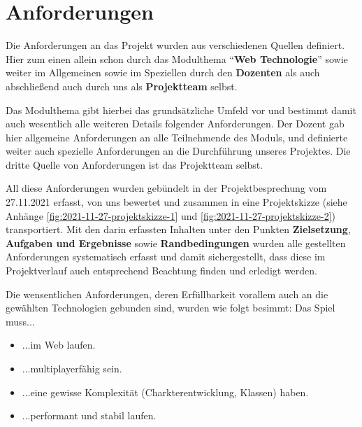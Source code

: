 
\section{Anforderungen} %



Die Anforderungen an das Projekt wurden aus verschiedenen Quellen definiert. Hier zum einen allein schon durch das Modulthema \enquote{\textbf{Web Technologie}} sowie weiter im Allgemeinen sowie im Speziellen durch den \textbf{Dozenten} als auch abschließend auch durch uns als \textbf{Projektteam} selbst. 

Das Modulthema gibt hierbei das grundsätzliche Umfeld vor und bestimmt damit auch wesentlich alle weiteren Details folgender Anforderungen. Der Dozent gab hier allgemeine Anforderungen an alle Teilnehmende des Moduls, und definierte weiter auch spezielle Anforderungen an die Durchführung unseres Projektes. Die dritte Quelle von Anforderungen ist das Projektteam selbst.  

All diese Anforderungen wurden gebündelt in der Projektbesprechung vom 27.11.2021 erfasst, von uns bewertet und zusammen in eine Projektskizze (siehe Anhänge \ref{fig:2021-11-27-projektskizze-1} und \ref{fig:2021-11-27-projektskizze-2}) transportiert. Mit den darin erfassten Inhalten unter den Punkten \textbf{Zielsetzung}, \textbf{Aufgaben und Ergebnisse} sowie \textbf{Randbedingungen} wurden alle gestellten Anforderungen systematisch erfasst und damit sichergestellt, dass diese im Projektverlauf auch entsprechend Beachtung finden und erledigt werden. 


Die wensentlichen Anforderungen, deren Erfüllbarkeit vorallem auch an die gewählten Technologien gebunden sind, wurden wie folgt besimmt: Das Spiel muss... \begin{itemize}
    \item ...im Web laufen.
    \item ...multiplayerfähig sein.
    \item ...eine gewisse Komplexität (Charkterentwicklung, Klassen) haben.
    \item ...performant und stabil laufen.
\end{itemize}

